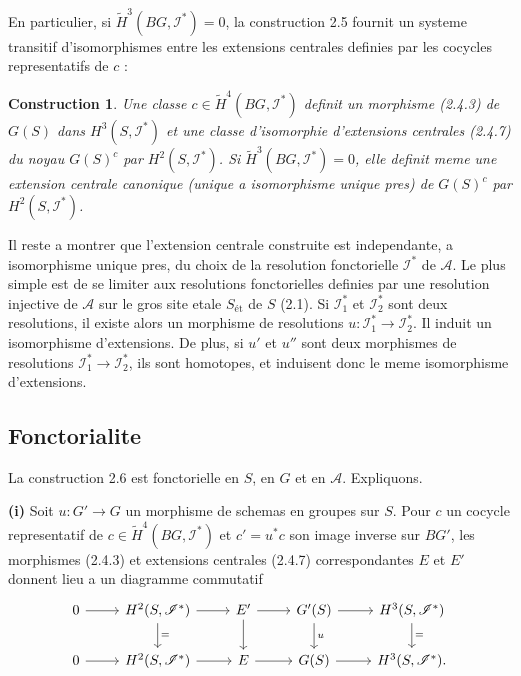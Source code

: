 \documentclass[11pt,a4paper]{article}
\theoremstyle{plain}
\newtheorem{construction}[theorem]{Construction}
\theoremstyle{definition}
\newcommand{\et}{\text{\'et}}
\begin{document}
En particulier, si $\widetilde{H}^3(BG, \mathscr{I}^*) = 0$, la construction 2.5 fournit un systeme transitif d'isomorphismes entre les extensions centrales definies par les cocycles representatifs de $c$ :

\begin{construction}\label{2.6}
Une classe $c \in \widetilde{H}^4(BG, \mathscr{I}^*)$ definit un morphisme (2.4.3) de $G(S)$ dans $H^3(S, \mathscr{I}^*)$ et une classe d'isomorphie d'extensions centrales (2.4.7) du noyau $G(S)^c$ par $H^2(S, \mathscr{I}^*)$. Si $\widetilde{H}^3(BG, \mathscr{I}^*) = 0$, elle definit meme une extension centrale canonique (unique a isomorphisme unique pres) de $G(S)^c$ par $H^2(S, \mathscr{I}^*)$.
\end{construction}

Il reste a montrer que l'extension centrale construite est independante, a isomorphisme unique pres, du choix de la resolution fonctorielle $\mathscr{I}^*$ de $\mathscr{A}$. Le plus simple est de se limiter aux resolutions fonctorielles definies par une resolution injective de $\mathscr{A}$ sur le gros site etale $S_{\et}$ de $S$ (2.1). Si $\mathscr{I}_1^*$ et $\mathscr{I}_2^*$ sont deux resolutions, il existe alors un morphisme de resolutions $u : \mathscr{I}_1^* \to \mathscr{I}_2^*$. Il induit un isomorphisme d'extensions. De plus, si $u'$ et $u''$ sont deux morphismes de resolutions $\mathscr{I}_1^* \to \mathscr{I}_2^*$, ils sont homotopes, et induisent donc le meme isomorphisme d'extensions.

\subsection{Fonctorialite}\label{2.7}

La construction 2.6 est fonctorielle en $S$, en $G$ et en $\mathscr{A}$. Expliquons.

\textbf{(i)} Soit $u : G' \to G$ un morphisme de schemas en groupes sur $S$. Pour $c$ un cocycle representatif de $c \in \widetilde{H}^4(BG, \mathscr{I}^*)$ et $c' = u^* c$ son image inverse sur $BG'$, les morphismes (2.4.3) et extensions centrales (2.4.7) correspondantes $E$ et $E'$ donnent lieu a un diagramme commutatif
\begin{equation}\label{2.7.1}
\begin{tikzcd}
0 \arrow{r} & H^2(S, \mathscr{I}^*) \arrow{r} \arrow{d}{=} & E' \arrow{r} \arrow{d} & G'(S) \arrow{r} \arrow{d}{u} & H^3(S, \mathscr{I}^*) \arrow{d}{=} \\
0 \arrow{r} & H^2(S, \mathscr{I}^*) \arrow{r} & E \arrow{r} & G(S) \arrow{r} & H^3(S, \mathscr{I}^*).
\end{tikzcd}
\end{equation}
\end{document}

